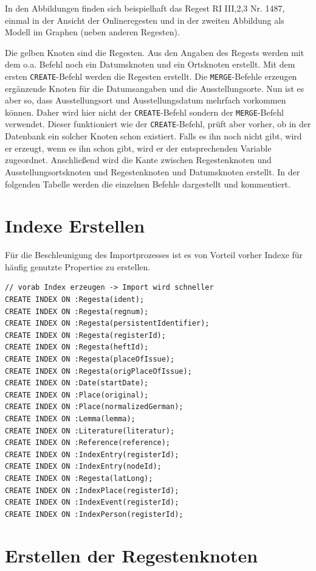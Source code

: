 \documentclass[ngerman,]{scrreprt}
\begin{document}
In den Abbildungen finden sich beispielhaft das Regest RI III,2,3 Nr. 1487, einmal in der Ansicht der Onlineregesten und in der zweiten Abbildung als Modell im Graphen (neben anderen Regesten).

Die gelben Knoten sind die Regesten. Aus den Angaben des Regests werden mit dem o.a. Befehl noch ein Datumsknoten und ein Ortsknoten erstellt. Mit dem ersten \texttt{CREATE}-Befehl werden die Regesten erstellt. Die \texttt{MERGE}-Befehle erzeugen ergänzende Knoten für die Datumsangaben und die Ausstellungsorte. Nun ist es aber so, dass Ausstellungsort und Ausstellungsdatum mehrfach vorkommen können. Daher wird hier nicht der \texttt{CREATE}-Befehl sondern der \texttt{MERGE}-Befehl verwendet. Dieser funktioniert wie der \texttt{CREATE}-Befehl, prüft aber vorher, ob in der Datenbank ein solcher Knoten schon existiert. Falls es ihn noch nicht gibt, wird er erzeugt, wenn es ihn schon gibt, wird er der entsprechenden Variable zugeordnet. Anschließend wird die Kante zwischen Regestenknoten und Ausstellungsortsknoten und Regestenknoten und Datumsknoten erstellt. In der folgenden Tabelle werden die einzelnen Befehle dargestellt und kommentiert.

\section{Indexe Erstellen}\label{indexe-erstellen}

Für die Beschleunigung des Importprozesses ist es von Vorteil vorher Indexe für häufig genutzte Properties zu erstellen.

\begin{verbatim}
// vorab Index erzeugen -> Import wird schneller
CREATE INDEX ON :Regesta(ident);
CREATE INDEX ON :Regesta(regnum);
CREATE INDEX ON :Regesta(persistentIdentifier);
CREATE INDEX ON :Regesta(registerId);
CREATE INDEX ON :Regesta(heftId);
CREATE INDEX ON :Regesta(placeOfIssue);
CREATE INDEX ON :Regesta(origPlaceOfIssue);
CREATE INDEX ON :Date(startDate);
CREATE INDEX ON :Place(original);
CREATE INDEX ON :Place(normalizedGerman);
CREATE INDEX ON :Lemma(lemma);
CREATE INDEX ON :Literature(literatur);
CREATE INDEX ON :Reference(reference);
CREATE INDEX ON :IndexEntry(registerId);
CREATE INDEX ON :IndexEntry(nodeId);
CREATE INDEX ON :Regesta(latLong);
CREATE INDEX ON :IndexPlace(registerId);
CREATE INDEX ON :IndexEvent(registerId);
CREATE INDEX ON :IndexPerson(registerId);
\end{verbatim}

\section{Erstellen der Regestenknoten}\label{erstellen-der-regestenknoten}
\end{document}
